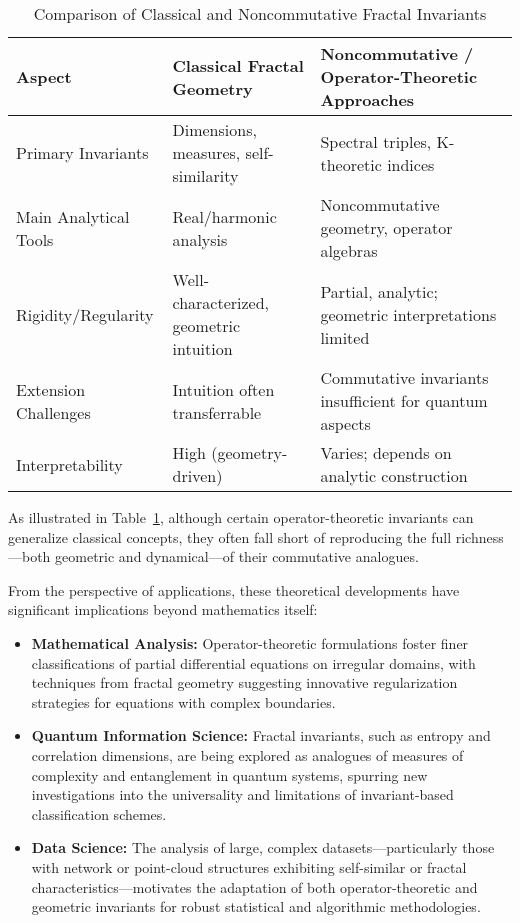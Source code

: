 \documentclass[11pt]{article}
\begin{document}
\begin{table}[htbp]
\centering
\caption{Comparison of Classical and Noncommutative Fractal Invariants}
\label{tab:fractal_invariant_comparison}
\begin{tabular}{|l|l|l|}
\hline
\textbf{Aspect} & \textbf{Classical Fractal Geometry} & \textbf{Noncommutative / Operator-Theoretic Approaches} \\
\hline
Primary Invariants & Dimensions, measures, self-similarity & Spectral triples, K-theoretic indices \\
\hline
Main Analytical Tools & Real/harmonic analysis & Noncommutative geometry, operator algebras \\
\hline
Rigidity/Regularity & Well-characterized, geometric intuition & Partial, analytic; geometric interpretations limited \\
\hline
Extension Challenges & Intuition often transferrable & Commutative invariants insufficient for quantum aspects \\
\hline
Interpretability & High (geometry-driven) & Varies; depends on analytic construction \\
\hline
\end{tabular}
\end{table}

As illustrated in Table~\ref{tab:fractal_invariant_comparison}, although certain operator-theoretic invariants can generalize classical concepts, they often fall short of reproducing the full richness—both geometric and dynamical—of their commutative analogues.

From the perspective of applications, these theoretical developments have significant implications beyond mathematics itself:

\begin{itemize}
    \item \textbf{Mathematical Analysis:} Operator-theoretic formulations foster finer classifications of partial differential equations on irregular domains, with techniques from fractal geometry suggesting innovative regularization strategies for equations with complex boundaries.
    \item \textbf{Quantum Information Science:} Fractal invariants, such as entropy and correlation dimensions, are being explored as analogues of measures of complexity and entanglement in quantum systems, spurring new investigations into the universality and limitations of invariant-based classification schemes.
    \item \textbf{Data Science:} The analysis of large, complex datasets—particularly those with network or point-cloud structures exhibiting self-similar or fractal characteristics—motivates the adaptation of both operator-theoretic and geometric invariants for robust statistical and algorithmic methodologies.
\end{itemize}
\end{document}

